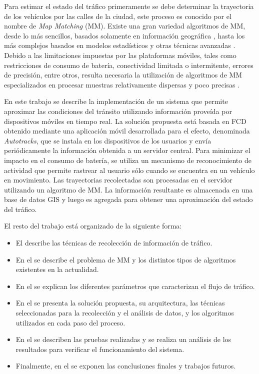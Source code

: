 Para estimar el estado del tráfico primeramente se debe determinar la trayectoria de los vehículos por las calles de la ciudad, este proceso es conocido por el nombre de \emph{Map Matching} (MM). Existe una gran variedad algoritmos de MM, desde lo más sencillos, basados solamente en información geográfica \cite{white2000some}, hasta los más complejos basados en modelos estadísticos y otras técnicas avanzadas \cite{quddus2006high,kim2001adaptive}. Debido a las limitaciones impuestas por las plataformas móviles, tales como restricciones de consumo de batería, conectividad limitada o intermitente, errores de precisión, entre otros, resulta necesaria la utilización de algoritmos de MM especializados en procesar muestras relativamente dispersas y poco precisas \cite{lou2009map}.

En este trabajo se describe la implementación de un sistema que permite aproximar las condiciones del tránsito utilizando información proveída por dispositivos móviles en tiempo real. La solución propuesta está basada en FCD obtenido mediante una aplicación móvil desarrollada para el efecto, denominada \emph{Autotracks}, que se instala en los dispositivos de los usuarios y envía periódicamente la información obtenida a un servidor central. Para minimizar el impacto en el consumo de batería, se utiliza un mecanismo de reconocimiento de actividad que permite rastrear al usuario sólo cuando se encuentra en un vehículo en movimiento. Las trayectorias recolectadas son procesadas en el servidor utilizando un algoritmo de MM. La información resultante es almacenada en una base de datos GIS y luego es agregada para obtener una aproximación del estado del tráfico.

El resto del trabajo está organizado de la siguiente forma:
\begin{itemize}
\item El  describe las técnicas de recolección de información de tráfico. 
\item En el  se describe el problema de MM y los distintos tipos de algoritmos existentes en la actualidad. 
\item En el  se explican los diferentes parámetros que caracterizan el flujo de tráfico. 
\item En el  se presenta la solución propuesta, su arquitectura, las técnicas seleccionadas para la recolección y el análisis de datos, y los algoritmos utilizados en cada paso del proceso. 
\item En el  se describen las pruebas realizadas y se realiza un análisis de los resultados para verificar el funcionamiento del sistema. 
\item Finalmente, en el  se exponen las conclusiones finales y trabajos futuros.
\end{itemize}
